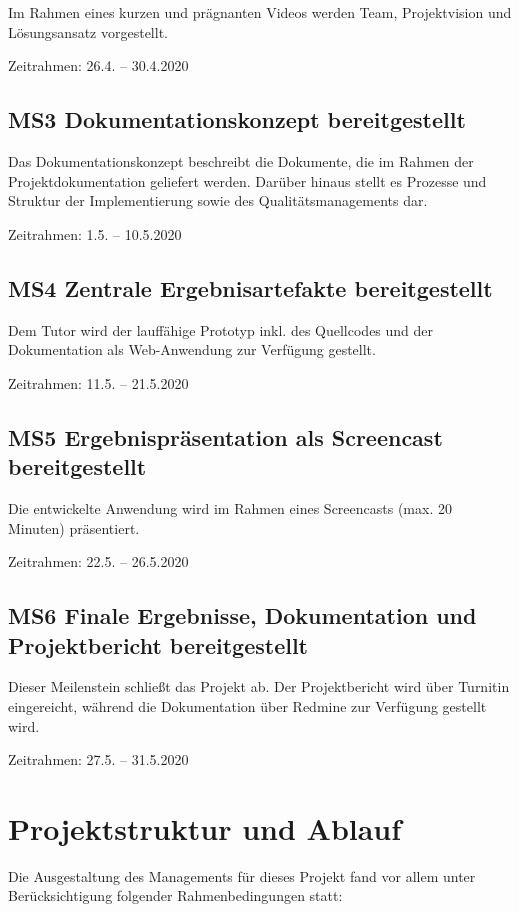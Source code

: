 \documentclass[a4paper,11pt,listof=numbered,glossary=totoc,parskip=half,toc=bib]{scrreprt}
\begin{document}
Im Rahmen eines kurzen und prägnanten Videos werden Team, Projektvision und Lösungsansatz vorgestellt.

Zeitrahmen: 26.4. -- 30.4.2020

\subsection{MS3 Dokumentationskonzept bereitgestellt}

Das Dokumentationskonzept beschreibt die Dokumente, die im Rahmen der Projektdokumentation geliefert werden. Darüber hinaus stellt es Prozesse und Struktur der Implementierung sowie des Qualitätsmanagements dar.

Zeitrahmen: 1.5. -- 10.5.2020

\subsection{MS4 Zentrale Ergebnisartefakte bereitgestellt}

Dem Tutor wird der lauffähige Prototyp inkl. des Quellcodes und der Dokumentation als Web-Anwendung zur Verfügung gestellt.

Zeitrahmen: 11.5. -- 21.5.2020

\subsection{MS5 Ergebnispräsentation als Screencast bereitgestellt}

Die entwickelte Anwendung wird im Rahmen eines Screencasts (max. 20 Minuten) präsentiert.

Zeitrahmen: 22.5. -- 26.5.2020

\subsection{MS6 Finale Ergebnisse, Dokumentation und Projektbericht bereitgestellt}

Dieser Meilenstein schließt das Projekt ab. Der Projektbericht wird über Turnitin eingereicht, während die Dokumentation über Redmine zur Verfügung gestellt wird.

Zeitrahmen: 27.5. -- 31.5.2020

	\newpage
	\section{Projektstruktur und Ablauf}

Die Ausgestaltung des Managements für dieses Projekt fand vor allem unter Berücksichtigung folgender Rahmenbedingungen statt:
\end{document}
